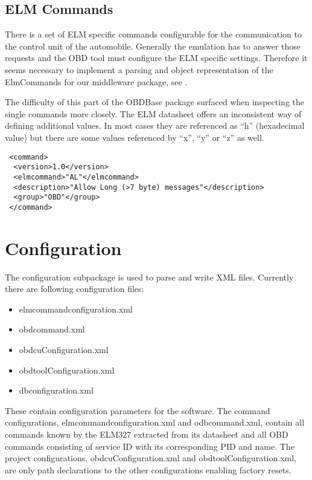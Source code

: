 \subsection{ELM Commands}
\label{sec:ELM}
There is a set of ELM specific commands configurable for the communication to the control unit of the automobile. Generally the emulation has to 
answer those requests and the OBD tool must configure the ELM specific settings. Therefore it seems necessary to implement a parsing and object 
representation of the ElmCommands \cite{ELMDATASHEET} for our middleware package, see .

The difficulty of this part of the OBDBase package surfaced when inspecting the single commands more closely. The ELM datasheet offers 
an inconsistent way of defining additional values. In most cases they are referenced as ``h'' (hexadecimal value) but there are some values 
referenced by ``x'', ``y'' or ``z'' as well.

\begin{verbatim}
 <command>
  <version>1.0</version>
  <elmcommand>"AL"</elmcommand>
  <description>"Allow Long (>7 byte) messages"</description> 
  <group>"OBD"</group>
 </command>
\end{verbatim}

\section{Configuration}
\label{sec:configuration}
The configuration subpackage is used to parse and write XML files. Currently there are following configuration files: 

\begin{itemize}
 \item elmcommandconfiguration.xml
 \item obdcommand.xml
 \item obdcuConfiguration.xml
 \item obdtoolConfiguration.xml
 \item dbconfiguration.xml
\end{itemize}

These contain configuration parameters for the software. The command configurations, elmcommandconfiguration.xml and odbcommand.xml, contain all 
commands known by the ELM327 extracted from its datasheet and all OBD commands consisting of service ID with its corresponding PID and name. 
The project configurations, obdcuConfiguration.xml and obdtoolConfiguration.xml, are only path declarations to the other configurations enabling 
factory resets.

